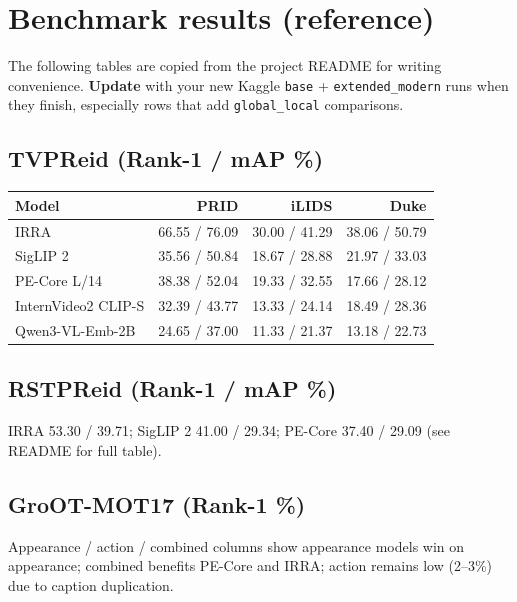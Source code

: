 \documentclass[11pt,a4paper]{article}
\begin{document}
\section{Benchmark results (reference)}

\label{sec:results}

The following tables are copied from the project README for writing convenience.
\textbf{Update} with your new Kaggle \texttt{base} + \texttt{extended\_modern} runs when they finish, especially rows that add \texttt{global\_local} comparisons.

\subsection{TVPReid (Rank-1 / mAP \%)}
\begin{table}[ht]
\centering
\small
\begin{tabular}{@{}lrrr@{}}
\toprule
Model & PRID & iLIDS & Duke \\
\midrule
IRRA & 66.55 / 76.09 & 30.00 / 41.29 & 38.06 / 50.79 \\
SigLIP 2 & 35.56 / 50.84 & 18.67 / 28.88 & 21.97 / 33.03 \\
PE-Core L/14 & 38.38 / 52.04 & 19.33 / 32.55 & 17.66 / 28.12 \\
InternVideo2 CLIP-S & 32.39 / 43.77 & 13.33 / 24.14 & 18.49 / 28.36 \\
Qwen3-VL-Emb-2B & 24.65 / 37.00 & 11.33 / 21.37 & 13.18 / 22.73 \\
\bottomrule
\end{tabular}
\end{table}

\subsection{RSTPReid (Rank-1 / mAP \%)}
IRRA 53.30 / 39.71; SigLIP 2 41.00 / 29.34; PE-Core 37.40 / 29.09 (see README for full table).

\subsection{GroOT-MOT17 (Rank-1 \%)}
Appearance / action / combined columns show appearance models win on appearance; combined benefits PE-Core and IRRA; action remains low (2--3\%) due to caption duplication.
\end{document}
